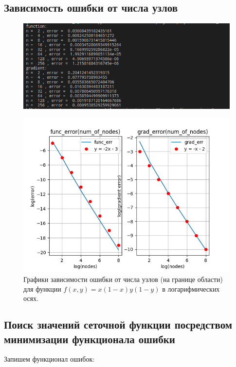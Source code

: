 \documentclass[12pt]{article}
\begin{document}
\subsection{Зависимость ошибки от числа узлов}

\begin{figure}[H] \label{fig1}
\centerline{\includegraphics[scale = 0.6]{0.png}}
\end{figure} 

\begin{figure}[H] \label{fig1}
\centerline{\includegraphics[scale = 0.9]{Figure_3.png}}
\caption{Графики зависимости ошибки от числа узлов (на границе области) 
для функции $f(x, y) = x(1-x)y(1-y)$ в логарифмических осях.}
\end{figure} 

\subsection{Поиск значений сеточной функции посредством минимизации функционала ошибки}

Запишем функционал ошибок:
\end{document}
